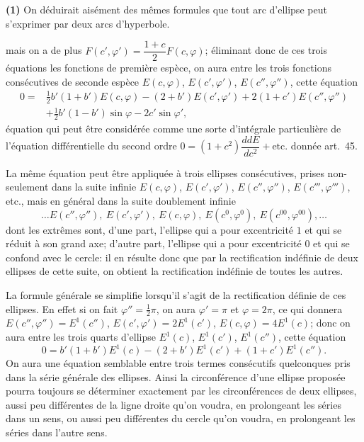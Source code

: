 \documentclass{article}
\begin{document}
\textbf{(1)} On déduirait aisément des mêmes formules que tout arc d'ellipse peut s'exprimer par deux arcs d'hyperbole.

mais on a de plus $F(c',\varphi')=\dfrac{1+c}{2}F(c,\varphi)$; éliminant donc de ces trois équations les fonctions de première espèce, on aura entre les trois fonctions consécutives de seconde espèce $E(c,\varphi)$, $E(c',\varphi')$, $E(c'',\varphi'')$, cette équation
\[ \begin{aligned} 0={}&\tfrac{1}{2}b'(1+b')E(c,\varphi)-(2+b')E(c',\varphi')+2(1+c')E(c'',\varphi'')\\ &+\tfrac{1}{2}b'(1-b')\sin\varphi-2c'\sin\varphi', \end{aligned} \]
équation qui peut être considérée comme une sorte d'intégrale particulière de l'équation différentielle du second ordre $0=(1+c^{2})\dfrac{ddE}{dc^{2}}+\text{etc.}$ donnée art.~45.

La même équation peut être appliquée à trois ellipses consécutives, prises non-seulement dans la suite infinie $E(c,\varphi)$, $E(c',\varphi')$, $E(c'',\varphi'')$, $E(c''',\varphi''')$, etc., mais en général dans la suite doublement infinie
\[ \ldots E(c'',\varphi''),\ E(c',\varphi'),\ E(c,\varphi),\ E(c^{0},\varphi^{0}),\ E(c^{00},\varphi^{00}),\ldots \]
dont les extrêmes sont, d'une part, l'ellipse qui a pour excentricité $1$ et qui se réduit à son grand axe; d'autre part, l'ellipse qui a pour excentricité $0$ et qui se confond avec le cercle: il en résulte donc que par la rectification indéfinie de deux ellipses de cette suite, on obtient la rectification indéfinie de toutes les autres.

La formule générale se simplifie lorsqu'il s'agit de la rectification définie de ces ellipses. En effet si on fait $\varphi''=\frac{1}{2}\pi$, on aura $\varphi'=\pi$ et $\varphi=2\pi$, ce qui donnera $E(c'',\varphi'')=E^{1}(c'')$, $E(c',\varphi')=2E^{1}(c')$, $E(c,\varphi)=4E^{1}(c)$; donc on aura entre les trois quarts d'ellipse $E^{1}(c)$, $E^{1}(c')$, $E^{1}(c'')$, cette équation
\[ 0=b'(1+b')E^{1}(c)-(2+b')E^{1}(c')+(1+c')E^{1}(c''). \]
On aura une équation semblable entre trois termes consécutifs quelconques pris dans la série générale des ellipses. Ainsi la circonférence d'une ellipse proposée pourra toujours se déterminer exactement par les circonférences de deux ellipses, aussi peu différentes de la ligne droite qu'on voudra, en prolongeant les séries dans un sens, ou aussi peu différentes du cercle qu'on voudra, en prolongeant les séries dans l'autre sens.
\end{document}
